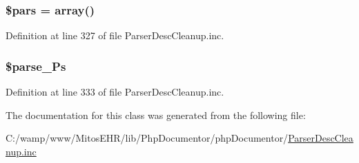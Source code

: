\hypertarget{classparser_desc_parser_ab8117573961eab022362e6fa8622ee1c}{
\subsubsection[{\$pars}]{\setlength{\rightskip}{0pt plus 5cm}\$pars = array()}}\label{classparser_desc_parser_ab8117573961eab022362e6fa8622ee1c}


\-Definition at line 327 of file \-Parser\-Desc\-Cleanup.\-inc.

\hypertarget{classparser_desc_parser_acd4431aa40ede0304317d587e1f185e6}{
\subsubsection[{\$parse\-\_\-\-Ps}]{\setlength{\rightskip}{0pt plus 5cm}\$parse\-\_\-\-Ps}}\label{classparser_desc_parser_acd4431aa40ede0304317d587e1f185e6}


\-Definition at line 333 of file \-Parser\-Desc\-Cleanup.\-inc.



\-The documentation for this class was generated from the following file\-:\begin{DoxyCompactItemize}
\item 
\-C\-:/wamp/www/\-Mitos\-E\-H\-R/lib/\-Php\-Documentor/php\-Documentor/\hyperlink{_parser_desc_cleanup_8inc}{\-Parser\-Desc\-Cleanup.\-inc}\end{DoxyCompactItemize}
